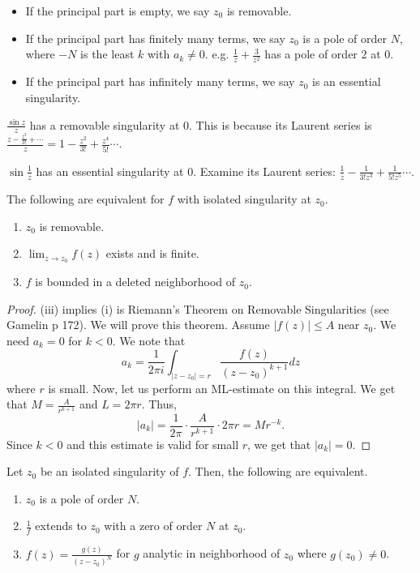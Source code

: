 \documentclass[11pt,leqno,oneside]{amsart}
\begin{document}
  \begin{itemize}
  \item If the principal part is empty, we say $z_0$ is removable.
  \item If the principal part has finitely many terms, we say $z_0$ is
    a pole of order $N$, where $-N$ is the least $k$ with $a_k \neq
    0$. e.g. $\frac{1}{z}+\frac{3}{z^2}$ has a pole of order 2 at 0.
  \item If the principal part has infinitely many terms, we say $z_0$
    is an essential singularity.
  \end{itemize}
  \begin{example}
    $\frac{\sin z}{z}$ has a removable singularity at 0. This is
    because its Laurent series is $\frac{z-\frac{z^3}{3!}+\cdots}{z} =
    1-\frac{z^2}{3!}+\frac{z^4}{5!}\cdots$. 
  \end{example}
  \begin{example}
    $\sin \frac{1}{z}$ has an essential singularity at 0. Examine its
    Laurent series: $\frac{1}{z}-\frac{1}{3!z^3}+\frac{1}{5!z^5}\cdots$.
  \end{example}
  \begin{prop}
    The following are equivalent for $f$ with isolated singularity at
    $z_0$.
    \begin{enumerate}[label=(\roman*)]
    \item $z_0$ is removable.
    \item $\lim_{z \to z_0} f(z)$ exists and is finite.
    \item $f$ is bounded in a deleted neighborhood of $z_0$.
    \end{enumerate}
  \end{prop}
  \begin{proof}
    (iii) implies (i) is Riemann's Theorem on Removable Singularities
    (see Gamelin p 172). We will prove this theorem. Assume $|f(z)|
    \leq A$ near $z_0$. We need $a_k = 0$ for $k < 0$. We note that \[
      a_k = \frac{1}{2 \pi i}\int_{|z-z_0|=r} \frac{f(z)}{(z-z_0)^{k+1}}dz
    \]
    where $r$ is small. Now, let us perform an ML-estimate on this
    integral. We get that $M = \frac{A}{r^{k+1}}$ and $L = 2\pi
    r$. Thus, \[
      |a_k| = \frac{1}{2\pi} \cdot \frac{A}{r^{k+1}} \cdot 2 \pi r = Mr^{-k}.
    \]
    Since $k < 0$ and this estimate is valid for small $r$, we get
    that $|a_k| = 0$.
  \end{proof}
  \begin{lem}
    Let $z_0$ be an isolated singularity of $f$. Then, the following
    are equivalent.
    \begin{enumerate}[label=(\roman*)]
    \item $z_0$ is a pole of order $N$.
    \item $\frac{1}{f}$ extends to $z_0$ with a zero of order $N$ at
      $z_0$.
    \item $f(z) = \frac{g(z)}{(z-z_0)^N}$ for $g$ analytic in
      neighborhood of $z_0$ where $g(z_0) \neq 0$. 
    \end{enumerate}
  \end{lem}
\end{document}
